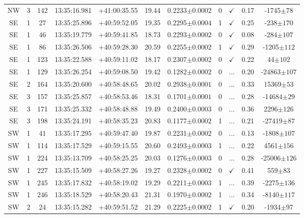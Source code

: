 \begin{landscape}
\begin{longtable}{ccccccccccc}
		NW & 3 & 142 & 13:35:16.981 & +41:00:35.55 & 19.44 & 0.2233$\pm{0.0002}$ & 0 & $\checkmark$ & 0.17 & -1745$\pm{78}$ \\
		SE & 1 & 27 & 13:35:25.896 & +40:59:52.05 & 19.35 & 0.2295$\pm{0.0004}$ & 1 & $\checkmark$ & 0.25 & -238$\pm{170}$ \\
		SE & 1 & 46 & 13:35:19.779 & +40:59:41.85 & 18.73 & 0.2293$\pm{0.0002}$ & 0 & $\checkmark$ & 0.08 & -284$\pm{107}$ \\
		SE & 1 & 86 & 13:35:26.506 & +40:59:28.30 & 20.59 & 0.2255$\pm{0.0002}$ & 1 & $\checkmark$ & 0.29 & -1205$\pm{112}$ \\
		SE & 1 & 123 & 13:35:22.588 & +40:59:11.02 & 18.17 & 0.2307$\pm{0.0002}$ & 0 & $\checkmark$ & 0.22 & 44$\pm{102}$ \\
		SE & 1 & 129 & 13:35:26.254 & +40:59:08.50 & 19.42 & 0.1282$\pm{0.0002}$ & 0 & ... & 0.20 & -24863$\pm{107}$ \\
		SE & 2 & 164 & 13:35:20.600 & +40:58:48.65 & 20.02 & 0.2938$\pm{0.0001}$ & 0 & ... & 0.33 & 15369$\pm{53}$ \\
		SE & 3 & 157 & 13:35:25.857 & +40:58:53.46 & 18.31 & 0.1701$\pm{0.0001}$ & 0 & ... & 0.28 & -14684$\pm{29}$ \\
		SE & 3 & 171 & 13:35:25.332 & +40:58:48.88 & 19.49 & 0.2400$\pm{0.0003}$ & 0 & ... & 0.36 & 2296$\pm{126}$ \\
		SE & 3 & 198 & 13:35:24.191 & +40:58:35.23 & 20.83 & 0.1177$\pm{0.0002}$ & 1 & ... & 0.21 & -27419$\pm{87}$ \\
		SW & 1 & 41 & 13:35:17.295 & +40:59:47.40 & 19.87 & 0.2231$\pm{0.0002}$ & 0 & ... & 0.13 & -1808$\pm{107}$ \\
		SW & 1 & 114 & 13:35:17.529 & +40:59:15.55 & 20.60 & 0.2493$\pm{0.0003}$ & 1 & ... & 0.22 & 4561$\pm{156}$ \\
		SW & 1 & 224 & 13:35:13.709 & +40:58:25.25 & 20.03 & 0.1276$\pm{0.0003}$ & 0 & ... & 0.28 & -25006$\pm{126}$ \\
		SW & 1 & 227 & 13:35:15.509 & +40:58:27.26 & 19.27 & 0.2328$\pm{0.0002}$ & 0 & $\checkmark$ & 0.41 & 559$\pm{83}$ \\
		SW & 1 & 245 & 13:35:17.832 & +40:58:19.02 & 19.29 & 0.2211$\pm{0.0003}$ & 1 & ... & 0.39 & -2275$\pm{136}$ \\
		SW & 1 & 246 & 13:35:18.529 & +40:58:20.43 & 21.31 & 0.1970$\pm{0.0002}$ & 1 & ... & 0.34 & -8140$\pm{117}$ \\
		SW & 2 & 24 & 13:35:15.282 & +40:59:51.52 & 21.29 & 0.2225$\pm{0.0002}$ & 1 & $\checkmark$ & 0.20 & -1934$\pm{97}$ \\

\end{longtable}
\end{landscape}
